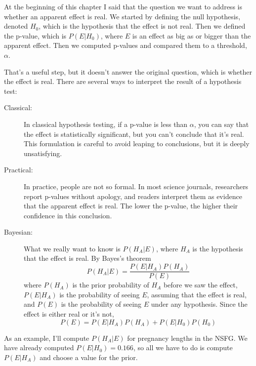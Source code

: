 \documentclass[12pt]{book}
\begin{document}
At the beginning of this chapter I said that the question we want to
address is whether an apparent effect is real.  We started by defining
the null hypothesis, denoted $H_0$, which is the
hypothesis that the effect is not real.  Then we defined the p-value,
which is $P(E | H_0)$, where $E$ is an effect as big as or bigger than
the apparent effect.  Then we computed p-values and compared
them to a threshold, $\alpha$.

That's a useful step, but it doesn't answer the original question,
which is whether the effect is real.  There are several ways to
interpret the result of a hypothesis test:

\begin{description}

\item[Classical:] In classical hypothesis testing, if a p-value
  is less than $\alpha$, you can say that the effect is statistically
  significant, but you can't conclude that it's real.  This
  formulation is careful to avoid leaping to conclusions, but it is
  deeply unsatisfying.

\item[Practical:] In practice, people are not so formal.  In most
  science journals, researchers report p-values without apology, and
  readers interpret them as evidence that the apparent effect is real.
  The lower the p-value, the higher their confidence in this
  conclusion.


\item[Bayesian:] What we really want to know is $P(H_A | E)$, where
  $H_A$ is the hypothesis that the effect is real.  By Bayes's theorem
  \[ P(H_A | E) = \frac{P(E | H_A) P(H_A)}{P(E)} \]
  where $P(H_A)$ is the prior probability of $H_A$ before we saw the
  effect, $P(E | H_A)$ is the probability of seeing $E$, assuming that
  the effect is real, and $P(E)$ is the probability of seeing $E$
  under any hypothesis.  Since the effect is either real or it's not,
  \[ P(E) = P(E | H_A) P(H_A) + P(E | H_0) P(H_0) \]

\end{description}

As an example, I'll compute $P(H_A | E)$ for pregnancy lengths in the
NSFG.  We have already computed $P(E | H_0)=0.166$, so all we have to
do is compute $P(E | H_A)$ and choose a value for the prior.

\end{document}
